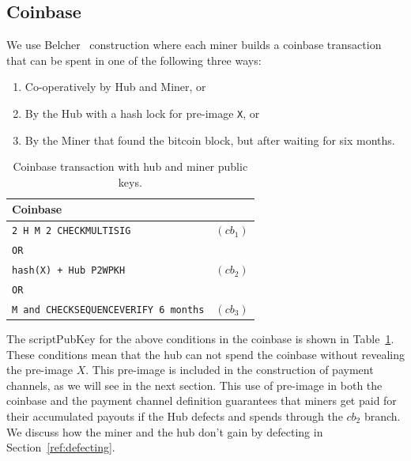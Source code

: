 \documentclass{article}
\begin{document}

\subsection{Coinbase}

We use Belcher~\cite{channels-for-rewards} construction where each
miner builds a coinbase transaction that can be spent in one of the
following three ways:

\begin{enumerate}
\item Co-operatively by Hub and Miner, or
\item By the Hub with a hash lock for pre-image \verb|X|, or
\item By the Miner that found the bitcoin block, but after waiting for
  six months.
\end{enumerate}

\begin{table}
  \centering
  \begin{tabular}{ lr }
    \bfseries Coinbase \\
    \midrule
    \verb|2 H M 2 CHECKMULTISIG| & $(cb_1)$ \\
    \verb|OR| \\
    \verb|hash(X) + Hub P2WPKH| & $(cb_2)$ \\
    \verb|OR| \\
    \verb|M and CHECKSEQUENCEVERIFY 6 months| & $(cb_3)$\\ 
    \midrule
  \end{tabular}
  \caption{Coinbase transaction with hub and miner public keys.}\label{table:coinbase}
\end{table}

The scriptPubKey for the above conditions in the coinbase is shown in
Table~\ref{table:coinbase}. These conditions mean that the hub can not
spend the coinbase without revealing the pre-image $X$. This pre-image
is included in the construction of payment channels, as we will see in
the next section. This use of pre-image in both the coinbase and the
payment channel definition guarantees that miners get paid for their
accumulated payouts if the Hub defects and spends through the $cb_2$
branch. We discuss how the miner and the hub don't gain by defecting
in Section~\ref{ref:defecting}.
\end{document}
